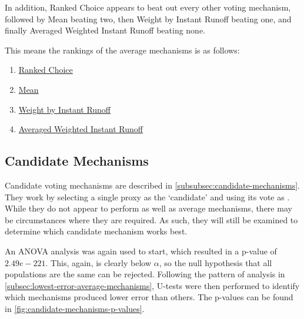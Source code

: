
In addition, Ranked Choice appears to beat out every other voting mechanism, followed
by Mean beating two, then Weight by Instant Runoff beating one, and finally Averaged
Weighted Instant Runoff beating none.
\begin{samepage}
    This means the rankings of the average mechanisms is as follows:
    \begin{enumerate}
        \item \hyperref[para:avg-ranked-choice]{Ranked Choice}
        \item \hyperref[para:mean]{Mean}
        \item \hyperref[para:avg-instant-runoff]{Weight by Instant Runoff}
        \item \hyperref[para:avg-weighted-instant-runoff]{Averaged Weighted Instant
        Runoff}
    \end{enumerate}
\end{samepage}

\subsection{Candidate Mechanisms}\label{subsec:lowest-error-candidate-mechanisms}
Candidate voting mechanisms are described in \autoref{subsubsec:candidate-mechanisms}.
They work by selecting a single proxy as the `candidate' and using its vote as
\systemtruth.
While they do not appear to perform as well as average mechanisms, there may be
circumstances where they are required.
As such, they will still be examined to determine which candidate mechanism works best.

An ANOVA analysis was again used to start, which resulted in a p-value of
$2.49e-221$.
This, again, is clearly below $\alpha$, so the null hypothesis that all populations
are the same can be rejected.
Following the pattern of analysis in
\autoref{subsec:lowest-error-average-mechanisms}, U-tests were then performed to
identify which mechanisms produced lower error than others.
The p-values can be found in \autoref{fig:candidate-mechanisms-p-values}.

